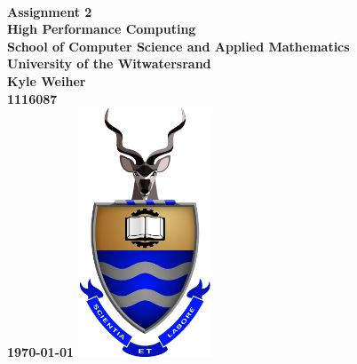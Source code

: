 \documentclass[a4paper,twoside,11pt]{report}
\begin{document}
	\onecolumn
	\thispagestyle{empty}
	
	
	\ 
	\begin{center}
		
		{
			\Large \bf \sc Assignment 2\\
			\large High Performance Computing\\[20pt]
			\large School of Computer Science and Applied Mathematics\\
			\large University of the Witwatersrand\\[20pt]
			\normalsize
			Kyle Weiher\\
			1116087\\[20pt]
			\today
		}
		\vfill
		\includegraphics[width=4cm]{images/wits}
		\vfill
		
		\vfill
	\end{center}

\newpage
\thispagestyle{plain}

\setcounter{page}{2}
\setcounter{chapter}{1}
\tableofcontents

\clearpage
{}
\setcounter{page}{1}
\end{document}
